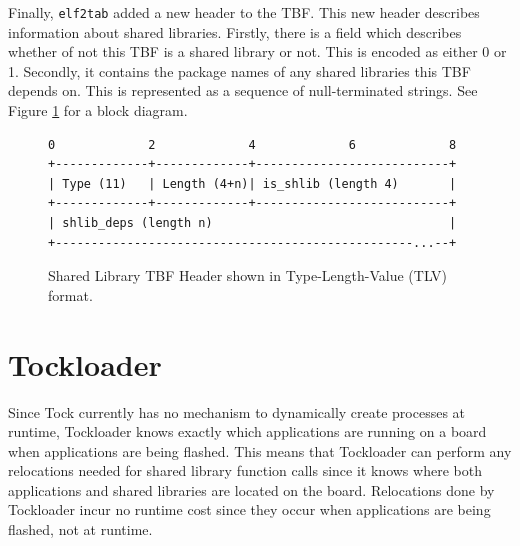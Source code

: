 \documentclass[12pt]{ucsddissertation}
\begin{document}
Finally, \texttt{elf2tab} added a new header to the TBF. This new header describes information about shared libraries. Firstly, there is a field which describes whether of not this TBF is a shared library or not. This is encoded as either 0 or 1. Secondly, it contains the package names of any shared libraries this TBF depends on. This is represented as a sequence of null-terminated strings. See Figure \ref{fig:shlibtbf} for a block diagram.

\begin{figure}
\begin{verbatim}
0             2             4             6             8
+-------------+-------------+---------------------------+
| Type (11)   | Length (4+n)| is_shlib (length 4)       |
+-------------+-------------+---------------------------+
| shlib_deps (length n)                                 |
+--------------------------------------------------...--+ 
\end{verbatim}
    \caption[Shared Library TBF Header]{Shared Library TBF Header shown in Type-Length-Value (TLV) format.}
    \label{fig:shlibtbf}
\end{figure}

\section{Tockloader} \label{impl-tockloader}

Since Tock currently has no mechanism to dynamically create processes at runtime, Tockloader knows exactly which applications are running on a board when applications are being flashed. This means that Tockloader can perform any relocations needed for shared library function calls since it knows where both applications and shared libraries are located on the board. Relocations done by Tockloader incur no runtime cost since they occur when applications are being flashed, not at runtime.
\end{document}
